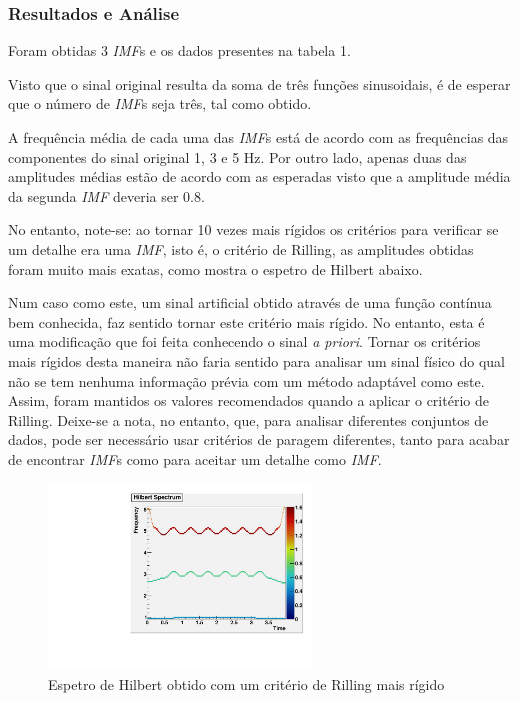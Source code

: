 \documentclass[letterpaper]{article}
\begin{document}
\begin{multicols}{2}
\subsubsection{Resultados e Análise}

\par Foram obtidas 3 \textit{IMF}s e os dados presentes na tabela 1.




\par Visto que o sinal original resulta da soma de três funções sinusoidais, é de esperar que o número de \textit{IMF}s seja três, tal como obtido. 
\par A frequência média de cada uma das \textit{IMF}s está de acordo com as frequências das componentes do sinal original 1, 3 e 5 Hz. Por outro lado, apenas duas das amplitudes médias estão de acordo com as esperadas visto que a amplitude média da segunda \textit{IMF} deveria ser 0.8.


\par No entanto, note-se: ao tornar 10 vezes mais rígidos os critérios para verificar se um detalhe era uma \textit{IMF}, isto é, o critério de Rilling, as amplitudes obtidas foram muito mais exatas, como mostra o espetro de Hilbert abaixo.
\par Num caso como este, um sinal artificial obtido através de uma função contínua bem conhecida, faz sentido tornar este critério mais rígido. No entanto, esta é uma modificação que foi feita conhecendo o sinal \textit{a priori}. Tornar os critérios mais rígidos desta maneira não faria sentido para analisar um sinal físico do qual não se tem nenhuma informação prévia com um método adaptável como este. Assim, foram mantidos os valores recomendados quando a aplicar o critério de Rilling. Deixe-se a nota, no entanto, que, para analisar diferentes conjuntos de dados, pode ser necessário usar critérios de paragem diferentes, tanto para acabar de encontrar \textit{IMF}s como para aceitar um detalhe como \textit{IMF}.

\begin{center}
\begin{figure}[H]
\centering
    \includegraphics[width=7cm]{hilbert-more-precision.pdf}
    \caption{Espetro de Hilbert obtido com um critério de Rilling mais rígido}
\end{figure}
\end{center}


\end{multicols}
\end{document}
